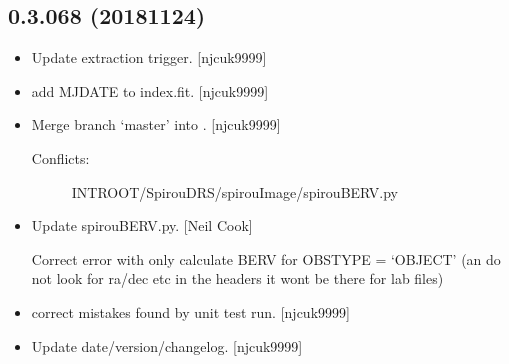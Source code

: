 \documentclass[a4paper,10pt,english]{report}
\begin{document}
\subsection{0.3.068 (2018\sphinxhyphen{}11\sphinxhyphen{}24)}
\label{\detokenize{misc/changelog:id273}}\begin{itemize}
\item {} 
Update extraction trigger. {[}njcuk9999{]}

\item {} 
 \sphinxhyphen{} add MJDATE to index.fit. {[}njcuk9999{]}

\item {} 
Merge branch ‘master’ into . {[}njcuk9999{]}
\begin{description}
\item[{Conflicts:}] \leavevmode
INTROOT/SpirouDRS/spirouImage/spirouBERV.py

\end{description}

\item {} 
Update spirouBERV.py. {[}Neil Cook{]}

Correct error with  \sphinxhyphen{} only calculate BERV for OBSTYPE = ‘OBJECT’ (an do not look for ra/dec etc in the headers \sphinxhyphen{} it wont be there for lab files)

\item {} 
 \sphinxhyphen{} correct mistakes found by unit test run.
{[}njcuk9999{]}

\item {} 
Update date/version/changelog. {[}njcuk9999{]}

\end{itemize}
\end{document}
